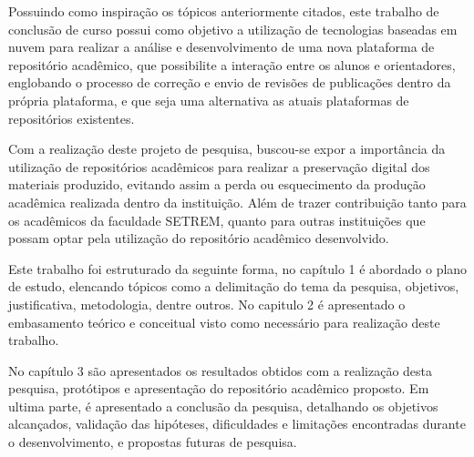Possuindo como inspiração os tópicos anteriormente citados,
este trabalho de conclusão de curso possui como objetivo a utilização
de tecnologias baseadas em nuvem para realizar a análise e
desenvolvimento de uma nova plataforma de repositório acadêmico,
que possibilite a interação entre os alunos e orientadores,
englobando o processo de correção e envio de revisões
de publicações dentro da própria plataforma, e que seja uma alternativa
as atuais plataformas de repositórios existentes.

Com a realização deste projeto de pesquisa, buscou-se expor a
importância da utilização de repositórios acadêmicos para realizar
a preservação digital dos materiais produzido, evitando assim a perda
ou esquecimento da produção acadêmica realizada dentro da instituição.
Além de trazer contribuição tanto para os acadêmicos da faculdade SETREM, quanto para outras
instituições que possam optar pela utilização do repositório
acadêmico desenvolvido.

Este trabalho foi estruturado da seguinte forma, no capítulo 1
é abordado o plano de estudo, elencando tópicos como a delimitação
do tema da pesquisa, objetivos, justificativa, metodologia, dentre outros.
No capitulo 2 é apresentado o embasamento teórico e conceitual
visto como necessário para realização deste trabalho.

No capítulo 3 são apresentados os resultados obtidos com a realização desta
pesquisa, protótipos e apresentação do repositório acadêmico proposto.
Em ultima parte, é apresentado a conclusão da pesquisa,
detalhando os objetivos alcançados, validação das hipóteses, dificuldades
e limitações encontradas durante o desenvolvimento, e propostas futuras
de pesquisa.
